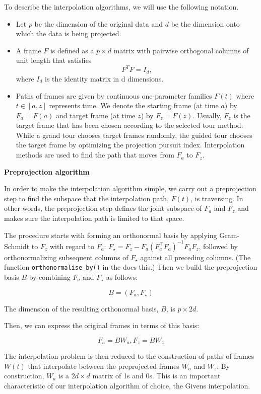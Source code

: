 To describe the interpolation algorithms, we will use the following notation.

\begin{itemize}
\item
  Let \(p\) be the dimension of the original data and \(d\) be the dimension onto which the data is being projected.
\item
  A frame \(F\) is defined as a \(p\times d\) matrix with pairwise orthogonal columns of unit length that satisfies
  \[F^TF = I_d,\]
  where \(I_d\) is the identity matrix in d dimensions.
\item
  Paths of frames are given by continuous one-parameter families \(F(t)\) where \(t\in [a, z]\) represents time. We denote the starting frame (at time \(a\)) by \(F_a = F(a)\) and target frame (at time \(z\)) by \(F_z = F(z)\). Usually, \(F_z\) is the target frame that has been chosen according to the selected tour method. While a grand tour chooses target frames randomly, the guided tour chooses the target frame by optimizing the projection pursuit index. Interpolation methods are used to find the path that moves from \(F_a\) to \(F_z\).
\end{itemize}

\textbf{Preprojection algorithm}

In order to make the interpolation algorithm simple, we carry out a preprojection step to find the subspace that the interpolation path, \(F(t)\), is traversing. In other words, the preprojection step defines the joint subspace of \(F_a\) and \(F_z\) and makes sure the interpolation path is limited to that space.

The procedure starts with forming an orthonormal basis by applying Gram-Schmidt to \(F_z\) with regard to \(F_a\): \(F_\star = F_z - F_a(F_a^\top F_a)^{-1}F_aF_z\), followed by orthonormalizing subsequent columns of \(F_\star\) against all preceding columns. (The function \texttt{orthonormalise\_by()} in the  does this.) Then we build the preprojection basis \(B\) by combining \(F_a\) and \(F_\star\) as follows:

\[B = (F_a, F_{\star})\]

The dimension of the resulting orthonormal basis, \(B\), is \(p\times 2d\).

Then, we can express the original frames in terms of this basis:

\[F_a = B W_a, F_z = B W_z\]

The interpolation problem is then reduced to the construction of paths of frames \(W(t)\) that interpolate between the preprojected frames \(W_a\) and \(W_z\). By construction, \(W_a\) is a \(2d\times d\) matrix of 1s and 0s. This is an important characteristic of our interpolation algorithm of choice, the Givens interpolation.

